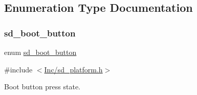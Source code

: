 \subsection{Enumeration Type Documentation}
\mbox{\label{group___s_d___platform_ga0cfdf02c4e2dcebe57216fb62c79d464}} 
\subsubsection{\texorpdfstring{sd\+\_\+boot\+\_\+button}{sd\_boot\_button}}
{\footnotesize\ttfamily enum \mbox{\hyperlink{group___s_d___platform_ga0cfdf02c4e2dcebe57216fb62c79d464}{sd\+\_\+boot\+\_\+button}}}



{\ttfamily \#include $<$\mbox{\hyperlink{sd__platform_8h}{Inc/sd\+\_\+platform.\+h}}$>$}



Boot button press state. 

